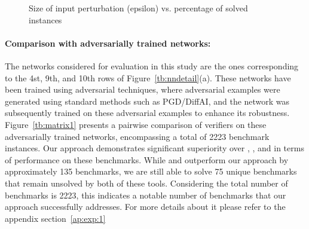 \begin{figure}[t]    \centering
\scalebox{0.8}{
  
  }
    \caption{Size of input perturbation (epsilon) vs. percentage of solved instances}
    \label{res:ep:milp_with_milp}
\end{figure}


\paragraph{Comparison with adversarially trained networks: }
The networks considered for evaluation in this study are the ones corresponding to the 4st, 9th, and 10th 
rows of Figure~\ref{tb:nndetail}(a). These networks have been trained using adversarial techniques, 
where adversarial examples were generated using standard methods such as PGD/DiffAI, and the network was subsequently 
trained on these adversarial examples to enhance its robustness. Figure~\ref{tb:matrix1} presents a 
pairwise comparison of verifiers on these adversarially trained networks, 
encompassing a total of 2223 benchmark instances. 
Our approach demonstrates significant superiority over \deeppoly{}, \kpoly{}, and \deepsrgr{} in terms of 
performance on these benchmarks. While \alphabeta{} and \ovaltool{} outperform our approach by approximately 
135 benchmarks, we are still able to solve 75 unique benchmarks that remain unsolved by both of these tools. 
Considering the total number of benchmarks is 2223, this indicates a notable number of benchmarks that our 
approach successfully addresses. For more details about it please refer to the appendix section~\ref{ap:exp:1}


